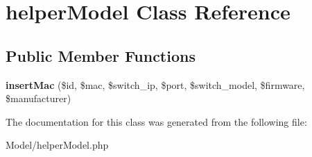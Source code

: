 \hypertarget{classhelper_model}{\section{helper\-Model Class Reference}
\label{classhelper_model}
}
\subsection*{Public Member Functions}
\begin{DoxyCompactItemize}
\item 
\hypertarget{classhelper_model_a64e87d3c9076ef6df046354edbc5b237}{{\bfseries insert\-Mac} (\$id, \$mac, \$switch\-\_\-ip, \$port, \$switch\-\_\-model, \$firmware, \$manufacturer)}\label{classhelper_model_a64e87d3c9076ef6df046354edbc5b237}

\end{DoxyCompactItemize}


The documentation for this class was generated from the following file\-:\begin{DoxyCompactItemize}
\item 
Model/helper\-Model.\-php\end{DoxyCompactItemize}
